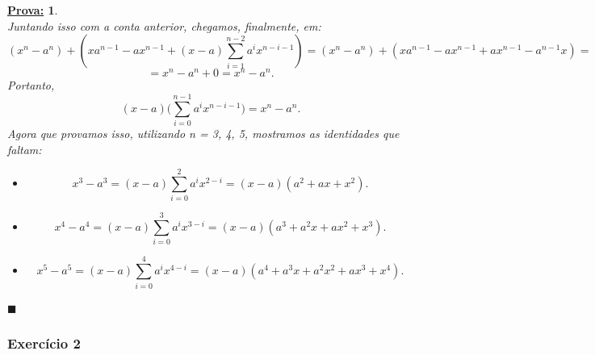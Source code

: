\documentclass{article}
\newtheorem*{proof*}{\underline{Prova:}}
\renewcommand\qedsymbol{$\blacksquare$}
\begin{document}
\begin{proof*}
$$	$$
	Juntando isso com a conta anterior, chegamos, finalmente, em:
	$$
		(x^n - a^n) + (xa^{n-1} - ax^{n-1} + (x-a)\sum_{i=1}^{n-2}a^ix^{n-i-1}) = (x^n - a^n) + (xa^{n-1} - ax^{n-1} + ax^{n-1} - a^{n-1}x ) =
	$$
	$$
		= x^n - a^n + 0 = x^n - a^n.
	$$
	Portanto,
	$$
		(x - a)\biggl(\sum_{i=0}^{n-1}a^ix^{n-i-1}\biggr) = x^n - a^n.
	$$
	Agora que provamos isso, utilizando n = 3, 4, 5, mostramos as identidades que faltam:
	\begin{itemize}
		\item[n=3:] $$ x^3 - a^3 = (x-a)\sum_{i=0}^{2}a^ix^{2-i} = (x-a)(a^2 + ax + x^2). $$
		\item[n=4:] $$ x^4 - a^4 = (x-a)\sum_{i=0}^{3}a^ix^{3-i} = (x-a)(a^3 + a^2x + ax^2 + x^3). $$
		\item[n=5:] $$ x^5 - a^5 = (x-a)\sum_{i=0}^{4}a^ix^{4-i} = (x-a)(a^4 + a^3x + a^2x^2 + ax^3 + x^4).$$
	\end{itemize}
	\qedsymbol
\end{proof*}

\subsubsection{Exerc\'icio 2}
\end{document}
